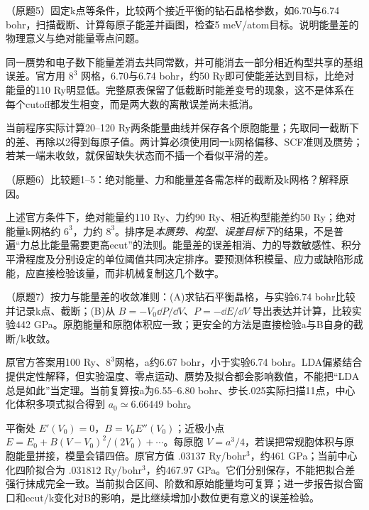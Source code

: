 \begin{exercise}\label{task:lab2-5}
（原题5）固定k点等条件，比较两个接近平衡的钻石晶格参数，如6.70与6.74 bohr，扫描截断、计算每原子能差并画图，检查5 meV/atom目标。说明能量差的物理意义与绝对能量零点问题。
\end{exercise}
\begin{solution}
同一赝势和电子数下能量差消去共同常数，并可能消去一部分相近构型共享的基组误差。官方用 $8^3$ 网格，6.70与6.74 bohr，约50 Ry即可使能差达到目标，比绝对能量的110 Ry明显低。完整原表保留了低截断时能差变号的现象，这不是体系在每个cutoff都发生相变，而是两大数的离散误差尚未抵消。

当前程序实际计算20--120 Ry两条能量曲线并保存各个原胞能量；先取同一截断下的差、再除以2得到每原子值。两计算必须使用同一k网格偏移、SCF准则及赝势；若某一端未收敛，就保留缺失状态而不插一个看似平滑的差。
\end{solution}

\begin{exercise}\label{task:lab2-6}
（原题6）比较题1--5：绝对能量、力和能量差各需怎样的截断及k网格？解释原因。
\end{exercise}
\begin{solution}
上述官方条件下，绝对能量约110 Ry、力约90 Ry、相近构型能差约50 Ry；绝对能量k网格约 $6^3$，力约 $8^3$。排序是\emph{本赝势、构型、误差目标下}的结果，不是普遍“力总比能量需要更高ecut”的法则。能量差的误差相消、力的导数敏感性、积分平滑程度及分别设定的单位阈值共同决定排序。要预测体积模量、应力或缺陷形成能，应直接检验该量，而非机械复制这几个数字。
\end{solution}

\begin{exercise}\label{task:lab2-7}
（原题7）按力与能量差的收敛准则：(A)求钻石平衡晶格，与实验6.74 bohr比较并记录k点、截断；(B)从 $B=-V_0\dd P/\dd V$、$P=-\dd E/\dd V$ 导出表达并计算，比较实验442 GPa。原胞能量和原胞体积应一致；更安全的方法是直接检验a与B自身的截断/k收敛。
\end{exercise}
\begin{solution}
原官方答案用100 Ry、$8^3$网格，a约6.67 bohr，小于实验6.74 bohr。LDA偏紧结合提供定性解释，但实验温度、零点运动、赝势及拟合都会影响数值，不能把“LDA总是如此”当定理。当前复算按a为6.55--6.80 bohr、步长.025实际扫描11点，中心化体积多项式拟合得到 $a_0\simeq6.66449$ bohr。

平衡处 $E'(V_0)=0$，$B=V_0E''(V_0)$；近极小点 $E=E_0+B(V-V_0)^2/(2V_0)+\cdots$。每原胞 $V=a^3/4$，若误把常规胞体积与原胞能量拼接，模量会错四倍。原官方值 $.03137$ Ry/bohr$^3$，约461 GPa；当前中心化四阶拟合为 $.031812$ Ry/bohr$^3$，约467.97 GPa。它们分别保存，不能把拟合差强行抹成完全一致。当前拟合区间、阶数和原始能量均可复算；进一步报告拟合窗口和ecut/k变化对B的影响，是比继续增加小数位更有意义的误差检验。
\end{solution}

